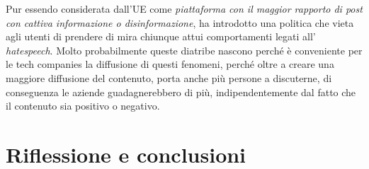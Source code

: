 \documentclass{article}
\begin{document}
\begin{justify}
    Pur essendo considerata dall'UE come \textit{piattaforma con il maggior rapporto di post con cattiva informazione o disinformazione}, ha introdotto una politica che vieta agli utenti di prendere di mira chiunque attui comportamenti legati all' \textit{hatespeech}.
    Molto probabilmente queste diatribe nascono perché è conveniente per le tech companies la diffusione di questi fenomeni, perché oltre a creare una maggiore diffusione del contenuto, porta anche più persone a discuterne, di conseguenza le aziende guadagnerebbero di più, indipendentemente dal fatto che il contenuto sia positivo o negativo.
\end{justify}

\centering
\newpage\section{Riflessione e conclusioni}
\begin{justify}
    
\end{justify}
\newpage

\end{document}
